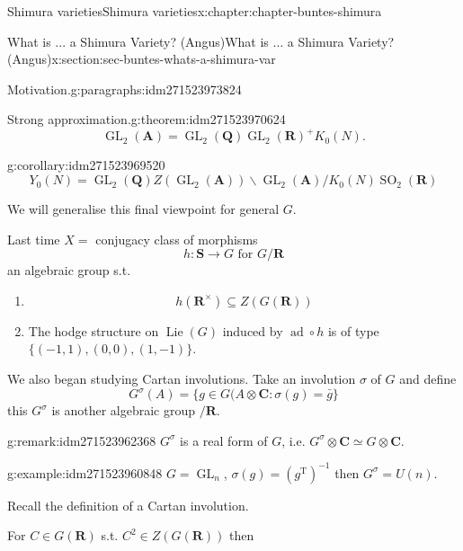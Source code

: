 \documentclass[oneside,10pt,]{book}
\numberwithin{equation}{section}
\DeclareMathOperator{\Lie}{Lie}
\newcommand{\inv}{^{-1}}
\newcommand{\QQ}{\mathbf{Q}}
\newcommand{\RR}{\mathbf{R}}
\newcommand{\CC}{\mathbf{C}}
\newcommand{\adeles}{\mathbf{A}}
\newcommand{\transpose}{\mathrm{T}}
\DeclareMathOperator{\ad}{ad}
\DeclareMathOperator{\GL}{GL}
\DeclareMathOperator{\specialorthogonal}{SO}
\begin{document}
\begin{chapterptx}{Shimura varieties}{}{Shimura varieties}{}{}{x:chapter:chapter-buntes-shimura}
\begin{sectionptx}{What is ... a Shimura Variety? (Angus)}{}{What is ... a Shimura Variety? (Angus)}{}{}{x:section:sec-buntes-whats-a-shimura-var}
\begin{paragraphs}{Motivation.}{g:paragraphs:idm271523973824}
\begin{equation*}
\end{equation*}
%
\begin{theorem}{Strong approximation.}{}{g:theorem:idm271523970624}%
%
\begin{equation*}
\GL_2(\adeles) = \GL_2(\QQ) \GL_2(\RR)^+ K_0(N)\text{.}
\end{equation*}
%
\end{theorem}
\begin{corollary}{}{}{g:corollary:idm271523969520}%
%
\begin{equation*}
Y_0(N) = \GL_2(\QQ)Z(\GL_2(\adeles)) \backslash \GL_2(\adeles) / K_0(N) \specialorthogonal_2(\RR)
\end{equation*}
%
\end{corollary}
We will generalise this final viewpoint for general \(G\).%
\end{paragraphs}%
\par
Last time \(X = \) conjugacy class of morphisms%
\begin{equation*}
h \colon \mathbf S \to G\text{ for } G/\RR
\end{equation*}
an algebraic group s.t.%
\begin{enumerate}
\item{}%
\begin{equation*}
h(\RR^\times)  \subseteq Z(G(\RR))
\end{equation*}
%
\item{}The hodge structure on \(\Lie(G)\) induced by \(\ad \circ h\) is of type \(\{(-1,1), (0,0), (1,-1)\}\).%
\end{enumerate}
%
\par
We also began studying Cartan involutions. Take an involution \(\sigma\) of \(G\) and define%
\begin{equation*}
G^\sigma(A) = \{ g\in G(A \otimes \CC : \sigma(g) = \bar g\}
\end{equation*}
this \(G^\sigma\) is another algebraic group \(/\RR\).%
\begin{remark}{}{g:remark:idm271523962368}%
\(G^\sigma\) is a real form of \(G\), i.e. \(G^\sigma \otimes \CC \simeq G \otimes \CC\).%
\end{remark}
\begin{example}{}{g:example:idm271523960848}%
\(G  =\GL_n\), \(\sigma(g) = (g^\transpose)\inv\) then \(G^\sigma =  U(n)\).%
\end{example}
Recall the definition of a Cartan involution.%
\par
For \(C \in G(\RR)\) s.t. \(C^2 \in Z(G(\RR))\) then%
\begin{equation*}

\end{equation*}
\end{sectionptx}
\end{chapterptx}
\end{document}
